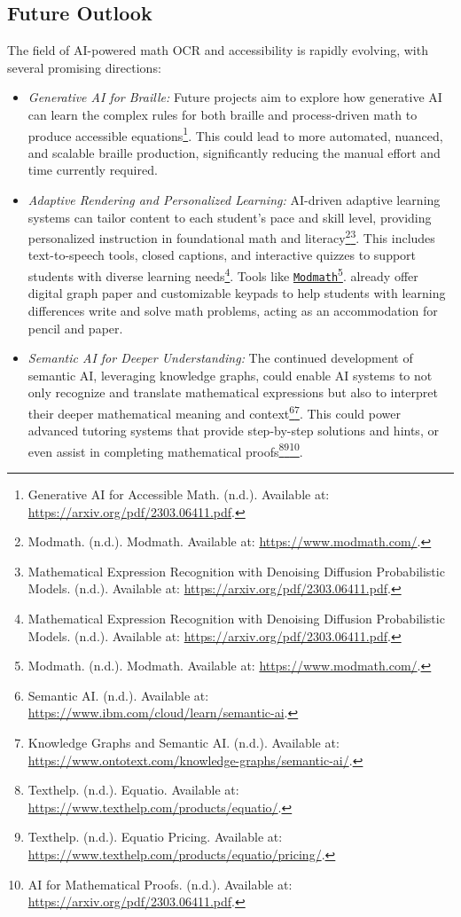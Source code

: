 \subsection{Future Outlook}
The field of AI-powered math OCR and accessibility is rapidly evolving, with several promising directions:
\begin{itemize}
    \item \emph{Generative AI for Braille:} Future projects aim to explore how generative AI can learn the complex rules for both braille and process-driven math to produce accessible equations\footnote{Generative AI for Accessible Math. (n.d.). Available at: \url{https://arxiv.org/pdf/2303.06411.pdf}.}. This could lead to more automated, nuanced, and scalable braille production, significantly reducing the manual effort and time currently required.
    \item \emph{Adaptive Rendering and Personalized Learning:} AI-driven adaptive learning systems can tailor content to each student's pace and skill level, providing personalized instruction in foundational math and literacy\footnote{Modmath. (n.d.). Modmath. Available at: \url{https://www.modmath.com/}.}\footnote{Mathematical Expression Recognition with Denoising Diffusion Probabilistic Models. (n.d.). Available at: \url{https://arxiv.org/pdf/2303.06411.pdf}.}. This includes text-to-speech tools, closed captions, and interactive quizzes to support students with diverse learning needs\footnote{Mathematical Expression Recognition with Denoising Diffusion Probabilistic Models. (n.d.). Available at: \url{https://arxiv.org/pdf/2303.06411.pdf}.}. Tools like \href{https://www.modmath.com/}{\texttt{Modmath}}\footnote{Modmath. (n.d.). Modmath. Available at: \url{https://www.modmath.com/}.}. already offer digital graph paper and customizable keypads to help students with learning differences write and solve math problems, acting as an accommodation for pencil and paper.
    \item \emph{Semantic AI for Deeper Understanding:} The continued development of semantic AI, leveraging knowledge graphs, could enable AI systems to not only recognize and translate mathematical expressions but also to interpret their deeper mathematical meaning and context\footnote{Semantic AI. (n.d.). Available at: \url{https://www.ibm.com/cloud/learn/semantic-ai}.}\footnote{Knowledge Graphs and Semantic AI. (n.d.). Available at: \url{https://www.ontotext.com/knowledge-graphs/semantic-ai/}.}. This could power advanced tutoring systems that provide step-by-step solutions and hints, or even assist in completing mathematical proofs\footnote{Texthelp. (n.d.). Equatio. Available at: \url{https://www.texthelp.com/products/equatio/}.}\footnote{Texthelp. (n.d.). Equatio Pricing. Available at: \url{https://www.texthelp.com/products/equatio/pricing/}.}\footnote{AI for Mathematical Proofs. (n.d.). Available at: \url{https://arxiv.org/pdf/2303.06411.pdf}.}.

\end{itemize}
